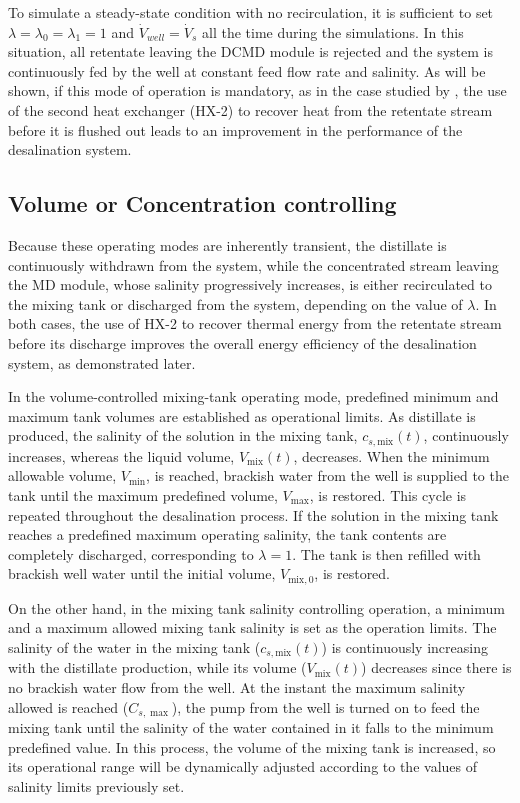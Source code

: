 \documentclass[14pt,letterpaper,fleqn]{extarticle}
\begin{document}
To simulate a steady-state condition with no recirculation, it is sufficient to set
$\lambda=\lambda_0=\lambda_1=1$ and $\dot{V}_{well}=\dot{V}_s$ all the time
during the simulations. In this situation, all retentate leaving the DCMD module is
rejected and the system is continuously fed by the well at constant feed flow rate and
salinity. As will be shown, if this mode of operation is mandatory, as in the case studied 
by \citet{Sampaio2022}, the use of the second heat exchanger (HX-2) to recover heat from 
the retentate stream before it is flushed out leads to an improvement in the performance
of the desalination system.

\subsection{Volume or Concentration controlling}
\label{subsec:vol-conc-control}

Because these operating modes are inherently transient, the distillate is continuously 
withdrawn from the system, while the concentrated stream leaving the MD module, whose 
salinity progressively increases, is either recirculated to the mixing tank or discharged
from the system, depending on the value of $\lambda$. In both cases, the use of HX-2 to recover 
thermal energy from the retentate stream before its discharge improves the overall energy efficiency 
of the desalination system, as demonstrated later.

In the volume-controlled mixing-tank operating mode, predefined minimum and maximum tank volumes are 
established as operational limits. As distillate is produced, the salinity of the solution in the mixing
tank, $c_{s,\mathrm{mix}}(t)$, continuously increases, whereas the liquid volume, $V_{\mathrm{mix}}(t)$, 
decreases. When the minimum allowable volume, $V_{\min}$, is reached, brackish water from the well is 
supplied to the tank until the maximum predefined volume, $V_{\max}$, is restored. This cycle is repeated 
throughout the desalination process. If the solution in the mixing tank reaches a predefined maximum operating 
salinity, the tank contents are completely discharged, corresponding to $\lambda = 1$. The tank is then
refilled with brackish well water until the initial volume, $V_{\mathrm{mix},0}$, is restored.

On the other hand, in the mixing tank salinity controlling operation, a minimum and a maximum
allowed mixing tank salinity is set as the operation limits. The salinity of the water in the
mixing tank ($c_{s,\mathrm{mix}}(t)$) is continuously increasing with the distillate production,
while its volume ($V_{\mathrm{mix}}(t)$) decreases since there is no brackish water flow from
the well. At the instant the maximum salinity allowed is reached ($C_{s,\max}$), the pump from
the well is turned on to feed the mixing tank until the salinity of the water contained in it
falls to the minimum predefined value. In this process, the volume of the mixing tank is
increased, so its operational range will be dynamically adjusted according to the values of
salinity limits previously set.
\end{document}
